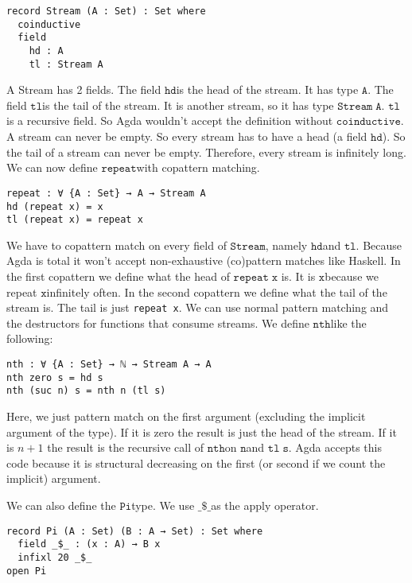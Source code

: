 \documentclass[a4paper,cleardoubleempty,BCOR1cm]{scrbook}
\begin{document}
\begin{verbatim}
record Stream (A : Set) : Set where
  coinductive
  field
    hd : A
    tl : Stream A
\end{verbatim}

A Stream has 2 fields. The field $\mathtt{hd}$\;is the head of the stream. It has type
$\mathtt{A}$. The field $\mathtt{tl}$\;is the tail of the stream. It is another stream, so it
has type $\mathtt{Stream\;A}$. $\mathtt{tl}$\;is a recursive field. So Agda wouldn't accept the
definition without $\mathtt{coinductive}$. A stream can never be empty. So every
stream has to have a head (a field $\mathtt{hd}$). So the tail of a stream can never
be empty. Therefore, every stream is infinitely long. We can now define
$\mathtt{repeat}$\;with copattern matching.

\begin{verbatim}
repeat : ∀ {A : Set} → A → Stream A
hd (repeat x) = x
tl (repeat x) = repeat x
\end{verbatim}

We have to copattern match on every field of $\mathtt{Stream}$, namely $\mathtt{hd}$\;and $\mathtt{tl}$.
Because Agda is total it won't accept non-exhaustive (co)pattern matches
like Haskell. In the first copattern we define what the head of $\mathtt{repeat\;x}$
is. It is $\mathtt{x}$\;because we repeat $\mathtt{x}$\;infinitely often. In the second
copattern we define what the tail of the stream is. The tail is just \texttt{repeat
\;\;\;\;x}. We can use normal pattern matching and the destructors for functions
that consume streams. We define $\mathtt{nth}$\;like the following:

\begin{verbatim}
nth : ∀ {A : Set} → ℕ → Stream A → A
nth zero s = hd s
nth (suc n) s = nth n (tl s)
\end{verbatim}

Here, we just pattern match on the first argument (excluding the implicit
argument of the type).  If it is zero the result is just the head of the
stream.  If it is \(n+1\) the result is the recursive call of $\mathtt{nth}$\;on $\mathtt{n}$\;and
$\mathtt{tl\;s}$.  Agda accepts this code because it is structural decreasing on the
first (or second if we count the implicit) argument.

We can also define the $\mathtt{Pi}$\;type.  We use $\mathtt{\_\$\_}$\;as the apply operator.

\begin{verbatim}
record Pi (A : Set) (B : A → Set) : Set where
  field _$_ : (x : A) → B x
  infixl 20 _$_
open Pi
\end{verbatim}
\end{document}
